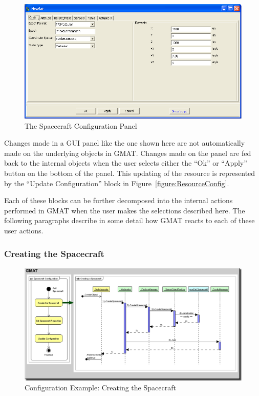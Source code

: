 \begin{figure}[htb]
\begin{center}
\includegraphics[403,212]{Images/SpacecraftPanel.png}
\caption{\label{figure:SpacecraftConfigPanel}The Spacecraft Configuration Panel}
\end{center}
\end{figure}

Changes made in a GUI panel like the one shown here are not automatically made on the underlying
objects in GMAT.  Changes made on the panel are fed back to the internal objects when the user
selects either the ``Ok'' or ``Apply'' button on the bottom of the panel.  This updating of the
resource is represented by the ``Update Configuration'' block in Figure~\ref{figure:ResourceConfig}.

Each of these blocks can be further decomposed into the internal actions performed in GMAT when the
user makes the selections described here.  The following paragraphs describe in some detail how GMAT
reacts to each of these user actions.

\subsubsection{\label{section:ObjectCreation}Creating the Spacecraft}

\begin{figure}[htb]
\begin{center}
\includegraphics[460,239]{Images/SpacecraftCreation.png}
\caption[Configuration Example: Creating the
Spacecraft]{\label{figure:CreatingResource}Configuration Example: Creating the Spacecraft}
\end{center}
\end{figure}

